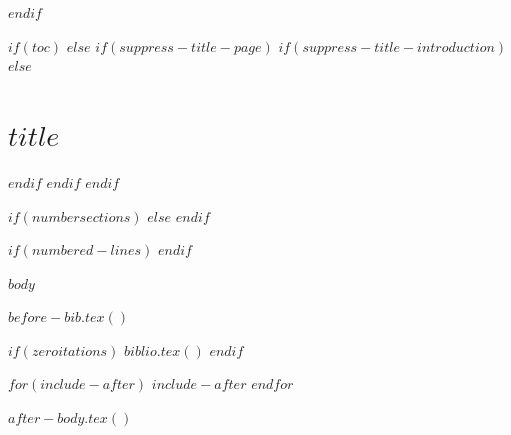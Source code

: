 $endif$


\renewcommand{\contentsname}{Table of Contents}

$if(toc)$
$else$
$if(suppress-title-page)$
$if(suppress-title-introduction)$
$else$
\section[Introduction]{$title$}
$endif$
$endif$
$endif$

$if(numbersections)$
\setcounter{secnumdepth}{$if(secnumdepth)$$secnumdepth$$else$5$endif$}
$else$
\setcounter{secnumdepth}{-\maxdimen} %
$endif$

\setlength\LTleft{0pt}

$if(numbered-lines)$
\resetlinenumber[1]
$endif$

$body$

$before-bib.tex()$

$if(zeroitations)$
$biblio.tex()$
$endif$

$for(include-after)$
$include-after$
$endfor$

$after-body.tex()$


